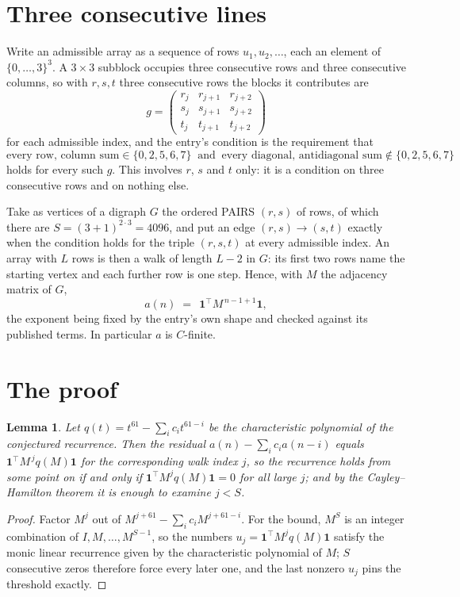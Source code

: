\documentclass[11pt,a4paper]{article}
\theoremstyle{plain}
\newtheorem{lemma}[theorem]{Lemma}
\theoremstyle{definition}
\begin{document}
\section{Three consecutive lines}

Write an admissible array as a sequence of rows $u_1,u_2,\dots$, each an element of
$\{0,\dots,3\}^{3}$. A $3\times3$ subblock occupies three consecutive rows and
three consecutive columns, so with $r,s,t$ three consecutive rows the blocks it
contributes are
\[
g=\begin{pmatrix}r_j&r_{j+1}&r_{j+2}\\ s_j&s_{j+1}&s_{j+2}\\ t_j&t_{j+1}&t_{j+2}\end{pmatrix}
\]
for each admissible index, and the entry's condition is the requirement that
\[
\text{every row, column sum} \in \{0,2,5,6,7\}\ \text{ and }\ \text{every diagonal, antidiagonal sum} \notin \{0,2,5,6,7\}
\]
holds for every such $g$. This involves $r$, $s$ and $t$ only: it is a condition on
three consecutive rows and on nothing else.

Take as vertices of a digraph $G$ the ordered PAIRS $(r,s)$ of rows, of which there are
$S=(3+1)^{2\cdot3}=4096$, and put an edge $(r,s)\to(s,t)$ exactly when the condition
holds for the triple $(r,s,t)$ at every admissible index. An array with $L$ rows is then a
walk of length $L-2$ in $G$: its first two rows name the starting vertex and each further
row is one step. Hence, with $M$ the adjacency matrix of $G$,
\[
a(n)\;=\;\,\mathbf{1}^{\!\top}M^{\,n-1+1}\mathbf{1},
\]
the exponent being fixed by the entry's own shape and checked against its published terms.
In particular $a$ is $C$-finite.

\section{The proof}

\begin{lemma}\label{lem:crit}
Let $q(t)=t^{61}-\sum_i c_it^{61-i}$ be the characteristic polynomial of the
conjectured recurrence. Then the residual $a(n)-\sum_ic_ia(n-i)$ equals
$\mathbf{1}^{\!\top}M^{\,j}q(M)\mathbf{1}$ for the corresponding walk index
$j$, so the recurrence holds from some point on if and only if
$\mathbf{1}^{\!\top}M^{j}q(M)\mathbf{1}=0$ for all large $j$; and by the
Cayley--Hamilton theorem it is enough to examine $j<S$.
\end{lemma}

\begin{proof}
Factor $M^{j}$ out of $M^{j+61}-\sum_ic_iM^{j+61-i}$. For the bound, $M^{S}$
is an integer combination of $I,M,\dots,M^{S-1}$, so the numbers
$u_j=\mathbf{1}^{\!\top}M^{j}q(M)\mathbf{1}$ satisfy the monic linear recurrence given by
the characteristic polynomial of $M$; $S$ consecutive zeros therefore force every later one,
and the last nonzero $u_j$ pins the threshold exactly.
\end{proof}
\end{document}
